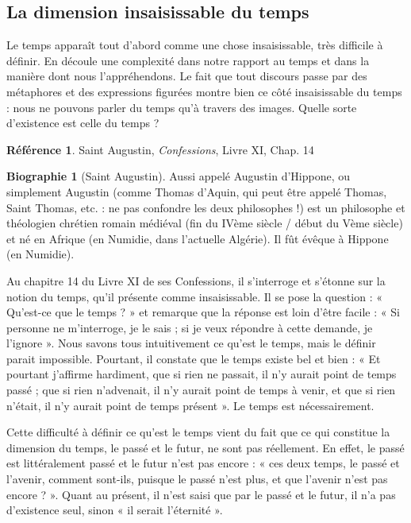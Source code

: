 \documentclass[french]{book}
\theoremstyle{definition}
\newtheorem*{refe}{Référence}
\newtheorem*{bio}{Biographie}
\begin{document}
\subsection{La dimension insaisissable du temps}

Le temps apparaît tout d’abord comme une chose insaisissable, très difficile à définir. En découle une complexité dans notre rapport au temps et dans la manière dont nous l’appréhendons. Le fait que tout discours passe par des métaphores et des expressions figurées montre bien ce côté insaisissable du temps : nous ne pouvons parler du temps qu’à travers des images. Quelle sorte d’existence est celle du temps ?

\begin{refe}
	Saint Augustin, \textit{Confessions}, Livre XI, Chap. 14
\end{refe}

\begin{bio}[Saint Augustin]
	Aussi appelé Augustin d’Hippone, ou simplement Augustin (comme Thomas d’Aquin, qui peut être appelé Thomas, Saint Thomas, etc. : ne pas confondre les deux philosophes !) est un philosophe et théologien chrétien romain médiéval (fin du IVème siècle / début du Vème siècle) et né en Afrique (en Numidie, dans l’actuelle Algérie). Il fût évêque à Hippone (en Numidie).
\end{bio}

Au chapitre 14 du Livre XI de ses Confessions, il s’interroge et s’étonne sur la notion du temps, qu’il présente comme insaisissable. Il se pose la question : « Qu’est-ce que le temps ? » et remarque que la réponse est loin d’être facile : « Si personne ne m’interroge, je le sais ; si je veux répondre à cette demande, je l’ignore ». Nous savons tous intuitivement ce qu’est le temps, mais le définir parait impossible. Pourtant, il constate que le
temps existe bel et bien : « Et pourtant j’affirme hardiment, que si rien ne passait, il n’y aurait point de temps passé ; que si rien n’advenait, il n’y aurait point de temps à venir, et que si rien n’était, il n’y aurait point de temps présent ». Le temps est nécessairement.

Cette difficulté à définir ce qu’est le temps vient du fait que ce qui constitue la dimension du temps, le passé et le futur, ne sont pas réellement. En effet, le passé est littéralement passé et le futur n’est pas encore : « ces deux temps, le passé et l’avenir, comment sont-ils, puisque le passé n’est plus, et que l’avenir n’est pas encore ? ». Quant au présent, il n’est saisi que par le passé et le futur, il n’a pas d’existence seul, sinon « il serait l’éternité ».
\end{document}
